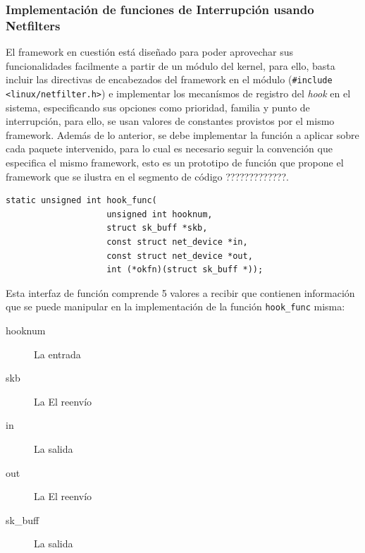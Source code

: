 \subsubsection{Implementación de funciones de Interrupción usando Netfilters}

El framework en cuestión está diseñado para poder aprovechar sus funcionalidades facilmente a partir de un módulo del kernel, para ello, basta incluir las directivas de encabezados del framework en el módulo (\verb=#include <linux/netfilter.h>=) e implementar los mecanísmos de registro del \emph{hook} en el sistema, especificando sus opciones como prioridad, familia y punto de interrupción, para ello, se usan valores de constantes provistos por el mismo framework. Además de lo anterior, se debe implementar la función a aplicar sobre cada paquete intervenido, para lo cual es necesario seguir la convención que especifica el mismo framework, esto es un prototipo de función que propone el framework que se ilustra en el segmento de código ?????????????.

\begin{lstlisting}[caption=ESO]
static unsigned int hook_func(
            		unsigned int hooknum,
            		struct sk_buff *skb, 
            		const struct net_device *in, 
            		const struct net_device *out, 
            		int (*okfn)(struct sk_buff *));
\end{lstlisting}

Esta interfaz de función comprende 5 valores a recibir que contienen información que se puede manipular en la implementación de la función \verb=hook_func= misma:
\begin{description}
\item[hooknum] La entrada
\item[skb] La El reenvío
\item[in] La salida
\item[out] La El reenvío
\item[sk\_buff] La salida
\end{description}

